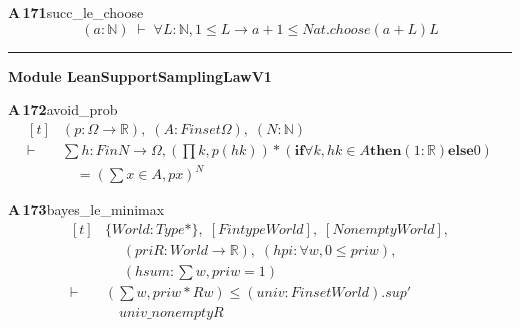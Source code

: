 \documentclass[conference]{IEEEtran}
\theoremstyle{definition}
\newcommand{\lean}[1]{\textsf{\footnotesize #1}}
\begin{document}
\noindent\textbf{A\,171}\quad\lean{succ\_le\_choose}
{\footnotesize\[ (\mathit{a} : \mathbb{N} ) \;\vdash\; \forall \mathit{L} : \mathbb{N} , 1 \leq \mathit{L} \to \mathit{a} + 1 \leq \mathit{Nat}.\mathit{choose} (\mathit{a} + \mathit{L}) \mathit{L} \]}

\vspace{4pt}\noindent\rule{\columnwidth}{0.4pt}\par\vspace{2pt}
\noindent\textbf{Module \lean{LeanSupportSamplingLawV1}}\par\vspace{3pt}

\noindent\textbf{A\,172}\quad\lean{avoid\_prob}
{\footnotesize\[ \begin{aligned}[t]
&(\mathit{p} : \Omega \to \mathbb{R} ),\; (\mathit{A} : \mathit{Finset} \Omega ),\; (\mathit{N} : \mathbb{N} )\\
\vdash\;&\textstyle\sum \mathit{h} : \mathit{Fin} \mathit{N} \to \Omega , (\textstyle\prod \mathit{k}, \mathit{p} (\mathit{h} \mathit{k})) * (\mathbf{if} \forall \mathit{k}, \mathit{h} \mathit{k} \in \mathit{A} \mathbf{then} (1:\mathbb{R} ) \mathbf{else} 0)\\
&\quad = (\textstyle\sum \mathit{x} \in \mathit{A}, \mathit{p} \mathit{x}) ^{\mathit{N}}
\end{aligned} \]}

\noindent\textbf{A\,173}\quad\lean{bayes\_le\_minimax}
{\footnotesize\[ \begin{aligned}[t]
&\{ \mathit{World} : \mathit{Type}*\},\; [\mathit{Fintype} \mathit{World}],\; [\mathit{Nonempty} \mathit{World}],\\
&\quad \; (\mathit{pri} \mathit{R} : \mathit{World} \to \mathbb{R} ),\; (\mathit{hpi} : \forall \mathit{w}, 0 \leq \mathit{pri} \mathit{w}),\\
&\quad \; (\mathit{hsum} : \textstyle\sum \mathit{w}, \mathit{pri} \mathit{w} = 1)\\
\vdash\;&(\textstyle\sum \mathit{w}, \mathit{pri} \mathit{w} * \mathit{R} \mathit{w}) \leq (\mathit{univ} : \mathit{Finset} \mathit{World}).\mathit{sup'}\\
&\quad \mathit{univ\_nonempty} \mathit{R}
\end{aligned} \]}
\end{document}
